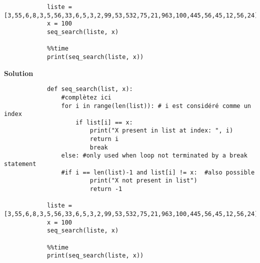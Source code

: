 \begin{Exercice}[5 minutes]
\begin{solution}
\begin{lstlisting}
            liste = [3,55,6,8,3,5,56,33,6,5,3,2,99,53,532,75,21,963,100,445,56,45,12,56,24]
            x = 100
            seq_search(liste, x)
            
            %%time 
            print(seq_search(liste, x))
        \end{lstlisting}   
    \end{solution}
\textbf{Solution}
    \begin{lstlisting}
            def seq_search(list, x):
                #complètez ici
                for i in range(len(list)): # i est considéré comme un index
                    if list[i] == x:
                        print("X present in list at index: ", i)
                        return i
                        break
                else: #only used when loop not terminated by a break statement
                #if i == len(list)-1 and list[i] != x:  #also possible
                        print("X not present in list")
                        return -1
            
            liste = [3,55,6,8,3,5,56,33,6,5,3,2,99,53,532,75,21,963,100,445,56,45,12,56,24]
            x = 100
            seq_search(liste, x)
            
            %%time 
            print(seq_search(liste, x))
    \end{lstlisting}  
\end{Exercice}

